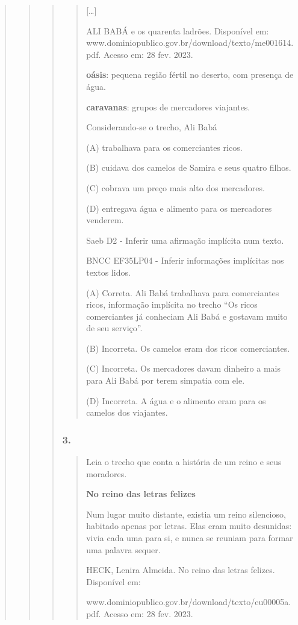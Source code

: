 \begin{quote}
\begin{quote}
\begin{quote}
\begin{quote}
{[}\ldots{}{]}

ALI BABÁ e os quarenta ladrões. Disponível em:
www.dominiopublico.gov.br/download/texto/me001614.pdf. Acesso em: 28
fev. 2023.

\textbf{oásis}: pequena região fértil no deserto, com presença de água.

\textbf{caravanas}: grupos de mercadores viajantes.

Considerando-se o trecho, Ali Babá

\protect\hypertarget{_Hlk128465624}{}{}(A) trabalhava para os
comerciantes ricos.

(B) cuidava dos camelos de Samira e seus quatro filhos.

(C) cobrava um preço mais alto dos mercadores.

(D) entregava água e alimento para os mercadores venderem.

Saeb D2 - Inferir uma afirmação implícita num texto.

BNCC EF35LP04 - Inferir informações implícitas nos textos lidos.

(A) Correta. Ali Babá trabalhava para comerciantes ricos, informação
implícita no trecho ``Os ricos comerciantes já conheciam Ali Babá e
gostavam muito de seu serviço''.

(B) Incorreta. Os camelos eram dos ricos comerciantes.

(C) Incorreta. Os mercadores davam dinheiro a mais para Ali Babá por
terem simpatia com ele.

(D) Incorreta. A água e o alimento eram para os camelos dos viajantes.
\end{quote}

\subsubsection{3. }\label{section-90}

\begin{quote}
Leia o trecho que conta a história de um reino e seus moradores.

\textbf{No reino das letras felizes}

Num lugar muito distante, existia um reino silencioso, habitado apenas
por letras. Elas eram muito desunidas: vivia cada uma para si, e nunca
se reuniam para formar uma palavra sequer.

HECK, Lenira Almeida. No reino das letras felizes. Disponível em:

www.dominiopublico.gov.br/download/texto/eu00005a.pdf. Acesso em: 28
fev. 2023.


\end{quote}
\end{quote}
\end{quote}
\end{quote}
